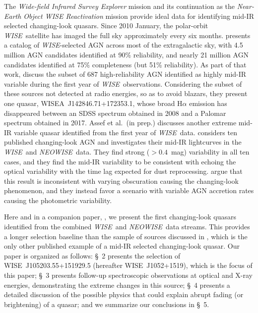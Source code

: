 \documentclass[iop]{emulateapj}
\def\etal{{et al.}}
\def\wise{{\it WISE}}
\def\neowise{{\it NEOWISE}}
\def\qso{WISE~J1052+1519}
\begin{document}
The {\it Wide-field Infrared Survey Explorer} \citep[{\it
WISE};][]{Wright:10} mission and its continuation as the {\it
Near-Earth Object WISE Reactivation} \citep[{\it NEOWISE};][]{Mainzer:14}
mission provide ideal data for identifying mid-IR selected changing-look
quasars.  Since 2010 January, the polar-orbit \wise\ satellite has
imaged the full sky approximately every six months.  \citet{Assef:18}
presents a catalog of \wise-selected AGN across most of the
extragalactic sky, with 4.5 million AGN candidates identified at
90\% reliability, and nearly 21 million AGN candidates identified
at 75\% completeness (but 51\% reliability).  As part of that work,
\citet{Assef:18} discuss the subset of 687 high-reliability AGN
identified as highly mid-IR variable during the first year of \wise\
observations.  Considering the subset of these sources not detected
at radio energies, so as to avoid blazars, they present one quasar,
WISEA~J142846.71+172353.1, whose broad H$\alpha$ emission has
disappeared between an SDSS spectrum obtained in 2008 and a Palomar
spectrum obtained in 2017.  Assef \etal\ (in prep.) discusses another
extreme mid-IR variable quasar identified from the first year of
\wise\ data.  \citet{Sheng:17} considers ten published changing-look
AGN and investigates their mid-IR lightcurves in the \wise\ and
\neowise\ data.  They find strong ($> 0.4$~mag) variability in all
ten cases, and they find the mid-IR variability to be consistent
with echoing the optical variability with the time lag expected for
dust reprocessing.  \citet{Sheng:17} argue that this result is
inconsistent with varying obscuration causing the changing-look
phenomenon, and they instead favor a scenario with variable AGN
accretion rates causing the photometric variability.

Here and in a companion paper, \citet{Ross:18}, we present the first
changing-look quasars identified from the combined \wise\ and
\neowise\ data streams.  This provides a longer selection baseline
than the sample of sources discussed in \citet{Assef:18}, which is
the only other published example of a mid-IR selected changing-look
quasar.  Our paper is organized as follows:  \S~2 presents the
selection of WISE~J105203.55+151929.5 (hereafter \qso), which is
the focus of this paper; \S~3 presents follow-up spectroscopic
observations at optical and X-ray energies, demonstrating the extreme
changes in this source; \S~4 presents a detailed discussion of the
possible physics that could explain abrupt fading (or brightening)
of a quasar; and we summarize our conclusions in \S~5.
\end{document}
